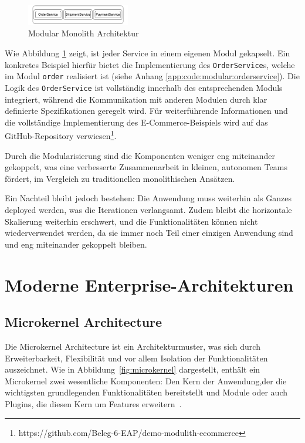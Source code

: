 \documentclass[acmtog]{acmart}
\begin{document}
\begin{figure}[h!]
  \centering
  \includegraphics[width=0.4\textwidth]{images/mono/mono-example.pdf}
  \caption{Modular Monolith Architektur}
  \label{fig:modular-mono}
\end{figure}

Wie Abbildung \ref{fig:modular-mono} zeigt, ist jeder Service in einem eigenen Modul gekapselt.
Ein konkretes Beispiel hierfür bietet die Implementierung des \texttt{OrderService}s, welche im Modul \texttt{order}
realisiert ist (siehe Anhang \ref{app:code:modular:orderservice}). Die Logik des \texttt{OrderService} ist vollständig
innerhalb des entsprechenden Moduls integriert, während die Kommunikation mit anderen Modulen durch klar definierte
Spezifikationen geregelt wird.
Für weiterführende Informationen und die vollständige Implementierung des E-Commerce-Beispiels
wird auf das GitHub-Repository verwiesen\footnote{https://github.com/Beleg-6-EAP/demo-modulith-ecommerce}.

Durch die Modularisierung sind die Komponenten weniger eng miteinander gekoppelt, was eine
verbesserte Zusammenarbeit in kleinen, autonomen Teams fördert, im Vergleich zu traditionellen
monolithischen Ansätzen.

Ein Nachteil bleibt jedoch bestehen: Die Anwendung muss weiterhin als Ganzes deployed werden,
was die Iterationen verlangsamt.
Zudem bleibt die horizontale Skalierung weiterhin erschwert,
und die Funktionalitäten können nicht wiederverwendet werden, da sie immer noch Teil einer
einzigen Anwendung sind und eng miteinander gekoppelt bleiben.
\section{Moderne Enterprise-Architekturen}

\subsection{Microkernel Architecture}\label{subsec:microkernel-architecture}
Die Microkernel Architecture ist ein Architekturmuster, was sich durch Erweiterbarkeit, Flexibilität und vor allem Isolation der Funktionalitäten auszeichnet.
Wie in Abbildung~\ref{fig:microkernel} dargestellt, enthält ein Microkernel zwei wesentliche Komponenten: Den Kern der Anwendung,der die wichtigsten grundlegenden Funktionalitäten bereitstellt und Module oder auch Plugins,
die diesen Kern um Features erweitern~\cite[21-22]{architecturePatterns}.
\end{document}
